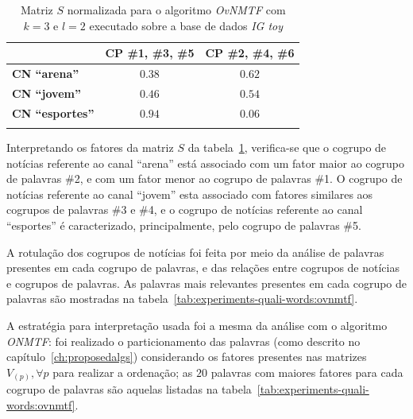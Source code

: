 \documentclass[
    12pt,                %
    oneside,            %
    a4paper,            %
    english,            %
    brazil                %
    ]{abntex2ppgsi}
\begin{document}
\begin{table}[H]
\centering
    \caption{Matriz $S$ normalizada para o algoritmo \textit{OvNMTF} com $k = 3$ e $l = 2$ executado sobre a base de dados \textit{IG toy}}
    \begin{tabular}{lcc}
        \hline
        & \textbf{CP \#1, \#3, \#5} & \textbf{CP \#2, \#4, \#6} \\
        \hline
        \textbf{CN ``arena''}    & $\mathbf{0.38}$ & $\mathbf{0.62}$ \\
        \textbf{CN ``jovem''}    & $\mathbf{0.46}$ & $\mathbf{0.54}$ \\
        \textbf{CN ``esportes''} & $\mathbf{0.94}$ & $0.06$ \\
        \hline \\
    \end{tabular}
    \label{tab:ovnmtf:matrizS}
\end{table}

Interpretando os fatores da matriz $S$ da tabela~\ref{tab:ovnmtf:matrizS}, verifica-se que o cogrupo de notícias referente ao canal ``arena'' está associado com um fator maior ao cogrupo de palavras \#2, e com um fator menor ao cogrupo de palavras \#1.
O cogrupo de notícias referente ao canal ``jovem'' esta associado com fatores similares aos cogrupos de palavras \#3 e \#4, e o cogrupo de notícias referente ao canal ``esportes'' é caracterizado, principalmente, pelo cogrupo de palavras \#5.

A rotulação dos cogrupos de notícias foi feita por meio da análise de palavras presentes em cada cogrupo de palavras, e das relações entre cogrupos de notícias e cogrupos de palavras.
As palavras mais relevantes presentes em cada cogrupo de palavras são mostradas na tabela~\ref{tab:experiments-quali-words:ovnmtf}.

A estratégia para interpretação usada foi a mesma da análise com o algoritmo \textit{ONMTF}: foi realizado o particionamento das palavras (como descrito no capítulo~\ref{ch:proposedalgs}) considerando os fatores presentes nas matrizes $V_{(p)}, \forall p$ para realizar a ordenação; as $20$ palavras com maiores fatores para cada cogrupo de palavras são aquelas listadas na tabela~\ref{tab:experiments-quali-words:ovnmtf}.

\end{document}
